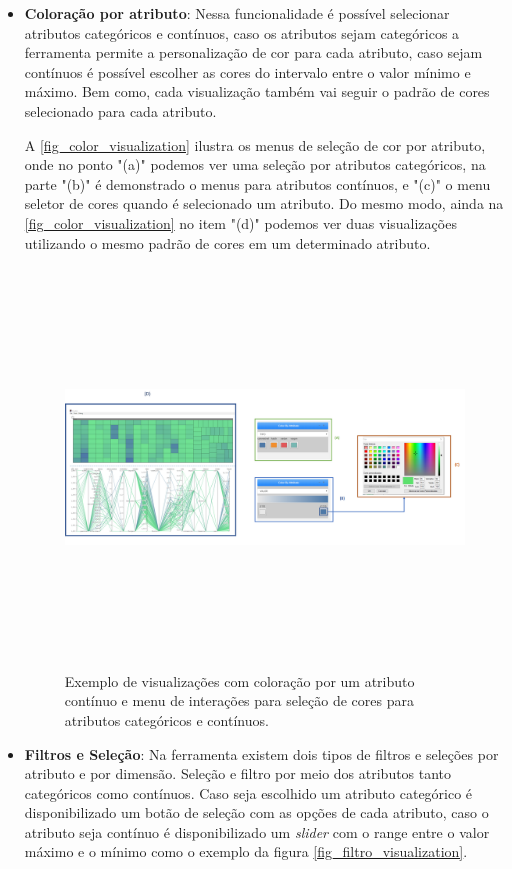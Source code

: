 \documentclass[
	12pt,				%
	openright,			%
	oneside,			%
	a4paper,			%
	english,			%
	brazil				%
	]{abntex2}
\begin{document}
\begin{itemize}
\item \textbf{Coloração por atributo}:
Nessa funcionalidade é possível selecionar atributos categóricos e contínuos, caso os atributos sejam categóricos a ferramenta permite a personalização de cor para cada atributo, caso sejam contínuos é possível escolher as cores do intervalo entre o valor mínimo e máximo. Bem como, cada visualização também vai seguir o padrão de cores selecionado para cada atributo.


A \autoref{fig_color_visualization} ilustra os menus de seleção de cor por atributo, onde no ponto "(a)" podemos ver uma seleção por atributos categóricos, na parte "(b)" é demonstrado o menus para atributos contínuos, e "(c)" o menu seletor de cores quando é selecionado um atributo. Do mesmo modo, ainda na \autoref{fig_color_visualization} no item "(d)" podemos ver duas visualizações utilizando o mesmo padrão de cores em um determinado atributo.

\begin{figure}
	\caption{\label{fig_color_visualization}  Exemplo de visualizações com coloração por um atributo contínuo e menu de interações para seleção de cores para atributos categóricos e contínuos.
}
	\begin{center}
	    \includegraphics[width=40pc,height=25pc,scale=1]{figures/duas visualizações_2.png}
	\end{center}
\end{figure}

\item \textbf{Filtros e Seleção}:
Na ferramenta existem dois tipos de filtros e seleções por atributo e por dimensão. Seleção e filtro por meio dos atributos tanto categóricos como contínuos. Caso seja escolhido um atributo categórico é disponibilizado um botão de seleção com as opções de cada atributo, caso o atributo seja contínuo é disponibilizado um \textit{slider} com o range entre o valor máximo e o mínimo como o exemplo da figura \autoref{fig_filtro_visualization}.


\end{itemize}
\end{document}
